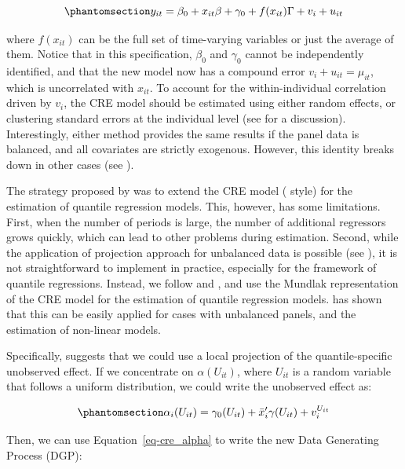 \documentclass[bib]{statapress}
\begin{document}
\begin{equation}\phantomsection\label{eq-cre-final}{y_{it} = \beta_0 + x_{it}\beta  + \gamma_0 + f(x_{it})\Gamma + v_i + u_{it}
}\end{equation}

where \(f(x_{it})\) can be the full set of time-varying variables or
just the average of them. Notice that in this specification, \(\beta_0\)
and \(\gamma_0\) cannot be independently identified, and that the new
model now has a compound error \(v_i + u_{it}=\mu_{it}\), which is
uncorrelated with \(x_{it}\). To account for the within-individual
correlation driven by \(v_i\), the CRE model should be estimated using
either random effects, or clustering standard errors at the individual
level (see \citet{wooldridge2010} for a discussion). Interestingly,
either method provides the same results if the panel data is balanced,
and all covariates are strictly exogenous. However, this identity breaks
down in other cases (see \citet{abrevaya2013}).

The strategy proposed by \citet{abrevaya2008} was to extend the CRE
model (\citet{chamberlain1982} style) for the estimation of quantile
regression models. This, however, has some limitations. First, when the
number of periods is large, the number of additional regressors grows
quickly, which can lead to other problems during estimation. Second,
while the application of \citet{chamberlain1982} projection approach for
unbalanced data is possible (see \citet{abrevaya2013}), it is not
straightforward to implement in practice, especially for the framework
of quantile regressions. Instead, we follow \citet{wooldridge2010} and
\citet{wooldridge2019}, and use the Mundlak representation of the CRE
model for the estimation of quantile regression models.
\citet{wooldridge2019} has shown that this can be easily applied for
cases with unbalanced panels, and the estimation of non-linear models.

Specifically, \citet{wooldridge2010} suggests that we could use a local
projection of the quantile-specific unobserved effect. If we concentrate
on \(\alpha(U_{it})\), where \(U_{it}\) is a random variable that
follows a uniform distribution, we could write the unobserved effect as:

\begin{equation}\phantomsection\label{eq-cre_alpha}{\alpha_i(U_{it})=\gamma_0(U_{it})+\bar x_i'\gamma(U_{it}) + v^{U_{it}}_i
}\end{equation}

Then, we can use Equation~\ref{eq-cre_alpha} to write the new Data
Generating Process (DGP):
\end{document}
